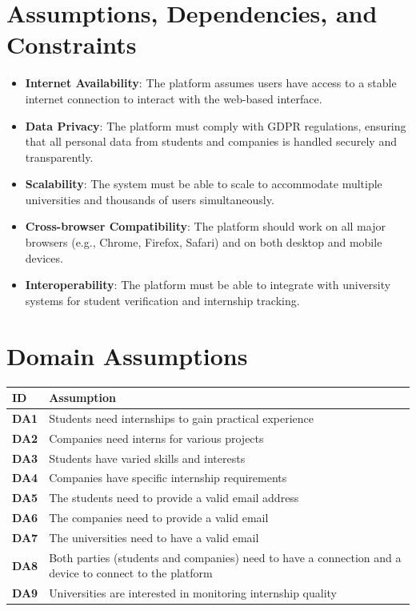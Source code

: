 \section{Assumptions, Dependencies, and Constraints}
\begin{itemize}
    \item \textbf{Internet Availability}: The platform assumes users have access to a stable internet connection to interact with the web-based interface.
    \item \textbf{Data Privacy}: The platform must comply with GDPR regulations, ensuring that all personal data from students and companies is handled securely and transparently.
    \item \textbf{Scalability}: The system must be able to scale to accommodate multiple universities and thousands of users simultaneously.
    \item \textbf{Cross-browser Compatibility}: The platform should work on all major browsers (e.g., Chrome, Firefox, Safari) and on both desktop and mobile devices.
    \item \textbf{Interoperability}: The platform must be able to integrate with university systems for student verification and internship tracking.
\end{itemize}

\section{Domain Assumptions}
\begin{longtable}{|p{1cm}|p{4cm}|}
\hline
\textbf{ID} & \textbf{Assumption} \\
\hline
\textbf{DA1} & Students need internships to gain practical experience \\
\hline
\textbf{DA2} & Companies need interns for various projects \\
\hline
\textbf{DA3} & Students have varied skills and interests \\
\hline
\textbf{DA4} & Companies have specific internship requirements \\
\hline
\textbf{DA5} & The students need to provide a valid email address \\
\hline
\textbf{DA6} & The companies need to provide a valid email \\
\hline
\textbf{DA7} & The universities need to have a valid email \\
\hline
\textbf{DA8} & Both parties (students and companies) need to have a connection and a device to connect to the platform \\
\hline
\textbf{DA9} & Universities are interested in monitoring internship quality \\
\hline
\end{longtable}
\newpage
